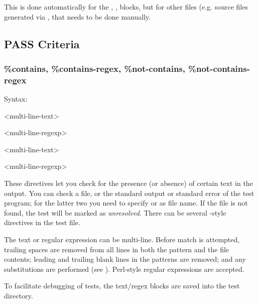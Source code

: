 This is done automatically for the , ,
 blocks, but for other files (e.g. source files generated
via , that needs to be done manually.


\subsection{PASS Criteria}
\label{sec:testing:opptest:pass-criteria}

\subsubsection{\%contains, \%contains-regex, \%not-contains, \%not-contains-regex}
\label{sec:testing:opptest:contains-and-co}

Syntax:

\begin{filelisting}
<multi-line-text>
\end{filelisting}

\begin{filelisting}
<multi-line-regexp>
\end{filelisting}

\begin{filelisting}
<multi-line-text>
\end{filelisting}

\begin{filelisting}
<multi-line-regexp>
\end{filelisting}

These directives let you check for the presence (or absence) of certain text in
the output. You can check a file, or the standard output or standard error of
the test program; for the latter two you need to specify  or
 as file name. If the file is not found, the test will be marked
as \textit{unresolved}. There can be several -style directives
in the test file.

The text or regular expression can be multi-line. Before match is attempted,
trailing spaces are removed from all lines in both the pattern and the
file contents; leading and trailing blank lines in the patterns are removed;
and any substitutions are performed (see ). Perl-style regular
expressions are accepted.

To facilitate debugging of tests, the text/regex blocks are saved into
the test directory.


